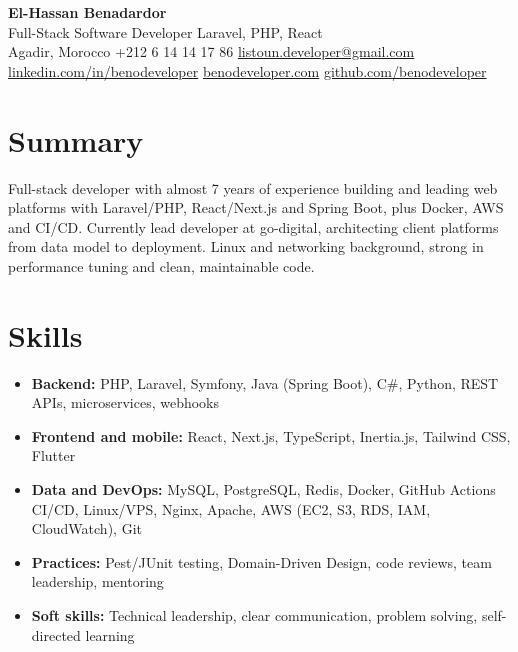 \documentclass[10pt,a4paper]{article}
\begin{document}
\begin{center}
  {\LARGE\bfseries El-Hassan Benadardor}\\[3pt]
  Full-Stack Software Developer \textbar{} Laravel, PHP, React\\[2pt]
  Agadir, Morocco \textbar{} +212 6 14 14 17 86 \textbar{}
  \href{mailto:listoun.developer@gmail.com}{listoun.developer@gmail.com}\\
  \href{https://www.linkedin.com/in/benodeveloper/}{linkedin.com/in/benodeveloper} \textbar{}
  \href{https://benodeveloper.com}{benodeveloper.com} \textbar{}
  \href{https://github.com/benodeveloper}{github.com/benodeveloper}
\end{center}

\section{Summary}
Full-stack developer with almost 7 years of experience building and leading web platforms with Laravel/PHP,
React/Next.js and Spring Boot, plus Docker, AWS and CI/CD. Currently lead developer at go-digital, architecting
client platforms from data model to deployment. Linux and networking background, strong in performance tuning
and clean, maintainable code.

\section{Skills}
\begin{itemize}
  \item \textbf{Backend:} PHP, Laravel, Symfony, Java (Spring Boot), C\#, Python, REST APIs, microservices, webhooks
  \item \textbf{Frontend and mobile:} React, Next.js, TypeScript, Inertia.js, Tailwind CSS, Flutter
  \item \textbf{Data and DevOps:} MySQL, PostgreSQL, Redis, Docker, GitHub Actions CI/CD, Linux/VPS, Nginx, Apache, AWS (EC2, S3, RDS, IAM, CloudWatch), Git
  \item \textbf{Practices:} Pest/JUnit testing, Domain-Driven Design, code reviews, team leadership, mentoring
  \item \textbf{Soft skills:} Technical leadership, clear communication, problem solving, self-directed learning
\end{itemize}

\end{document}
